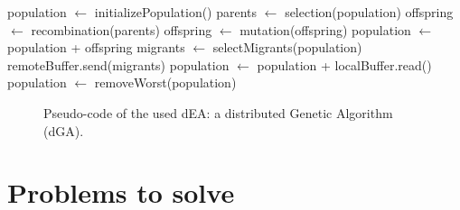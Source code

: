 \newsavebox{\algoadaptativebox}
\begin{lrbox}{\algoadaptativebox}
\begin{minipage}{10cm}
\begin{algorithmic} %
\STATE population $\gets$ initializePopulation()
    \STATE parents $\gets$ selection(population)
    \STATE offspring $\gets$ recombination(parents)
    \STATE offspring $\gets$ mutation(offspring)
    \STATE population $\gets$ population + offspring
      \STATE migrants $\gets$ selectMigrants(population)
      \STATE remoteBuffer.send(migrants) %
    \ENDIF
      \STATE population $\gets$ population + localBuffer.read()
    \ENDIF
    \STATE population $\gets$ removeWorst(population)
\ENDWHILE
\end{algorithmic}
\end{minipage}
\end{lrbox}

\begin{figure}
\usebox{\algoadaptativebox}
\caption{Pseudo-code of the used dEA: a distributed Genetic Algorithm
  (dGA).} %
\label{fig:EAused}
\end{figure}




\section{Problems to solve}

